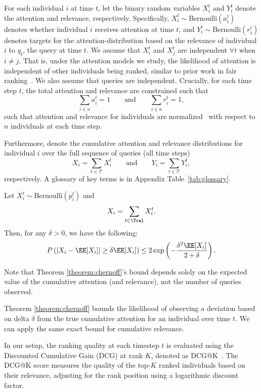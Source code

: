 For each individual $i$ at time $t$, let the binary random variables $X^t_i$ and $Y^t_i$ denote the attention and relevance, respectively. Specifically, $X^t_i \sim \text{Bernoulli}(a^t_i)$~\cite{wang2018position} denotes whether individual $i$ receives attention at time $t$, and $Y^t_i \sim \text{Bernoulli}(r^t_i)$ denotes targets for the attention-distribution based on the relevance of individual $i$ to $q_t$, the query at time $t$. We assume that $X^t_i$ and $X^t_j$ are independent $\forall t$ when $i \neq j$. That is, under the attention models we study, the likelihood of attention is independent of other individuals being ranked, similar to prior work in fair ranking~\cite{biega2018equity,singh2018fairness}. We also assume that queries are independent. Crucially, for each time step $t$, the total attention and relevance are constrained such that \[\sum_{i \in n} a_i^t = 1 \quad \quad \text{and} \quad \quad \sum_{i \in n} r_i^t = 1,\]
such that attention and relevance for individuals are normalized~\cite{biega2018equity} with respect to $n$ individuals at each time step.

Furthermore, denote the cumulative attention and relevance distributions for individual $i$ over the full sequence of queries (all time steps) \[X_i = \sum_{t \in \mathcal{T}} X^t_i \quad \quad \text{and} \quad \quad Y_i = \sum_{t \in \mathcal{T}} Y^t_i,\]
respectively. A glossary of key terms is in Appendix Table~\ref{tab:glossary}.




\begin{theorem} \label{theorem:chernoff}
Let $X_i^t \sim \text{Bernoulli}(p_i^t)$ and
\[
    X_i = \sum_{t\in \Tcal} X_i^t.
\]
Then, for any $\delta > 0$, we have the following:
\[
    P\left(|X_i - \EE[X_i]| \geq \delta \EE[X_i]\right) \leq 2\exp\left(-\frac{\delta^2 \EE[X_i]}{2 + \delta}\right).
\]
\end{theorem}

\begin{remark}
    Note that Theorem \ref{theorem:chernoff}'s bound depends solely on the expected value of the cumulative attention (and relevance), not the number of queries observed.
\end{remark}

Theorem \ref{theorem:chernoff} bounds the likelihood of observing a deviation based on delta $\delta$ from the true cumulative attention for an individual over time $t$. We can apply the same exact bound for cumulative relevance. 


In our setup, the ranking quality at each timestep $t$ is evaluated using the Discounted Cumulative Gain (DCG) at rank $K$, denoted as DCG@K~\cite{jarvelin2002cumulated}. The DCG@K score measures the quality of the top-$K$ ranked individuals based on their relevance, adjusting for the rank position using a logarithmic discount factor.


